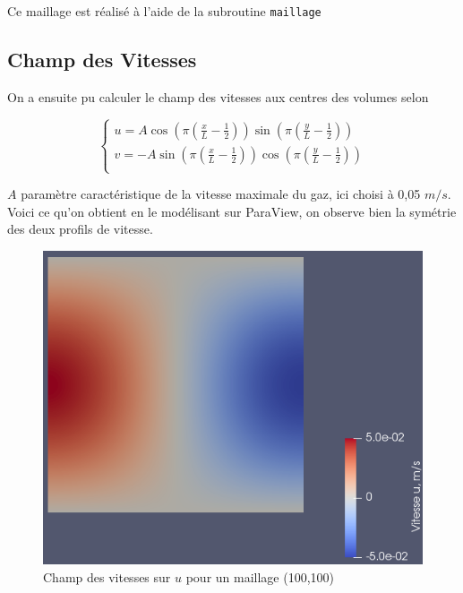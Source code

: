 \documentclass[a4paper,oneside]{article}
\begin{document}
Ce maillage est réalisé à l'aide de la subroutine \verb?maillage?

\subsection{Champ des Vitesses}

On a ensuite pu calculer le champ des vitesses aux centres des volumes selon 

\begin{equation*}
\begin{cases}
 u = A \cos \left( \pi \left( {\frac{x}{L} - \frac{1}{2}} \right) \right)  \sin \left( \pi \left( \frac{y}{L} - \frac{1}{2}\right) \right) \\
 v = -A \sin \left( \pi \left( {\frac{x}{L} - \frac{1}{2}} \right) \right)  \cos \left( \pi \left( \frac{y}{L} - \frac{1}{2}\right) \right) \\
\end{cases}
\end{equation*}

 $A$ paramètre caractéristique de la vitesse maximale du gaz, ici choisi à 0,05 $m/s$.\\
Voici ce qu'on obtient en le modélisant sur ParaView, on observe bien la symétrie des deux profils de vitesse.

\begin{figure}[h!]
\centering
        \includegraphics[scale=0.4]{Champ_Vitesse_Maillage/Champ_Vitesse_u.png}
        \caption{Champ des vitesses sur $u$ pour un maillage (100,100)}

\end{figure}
\end{document}
